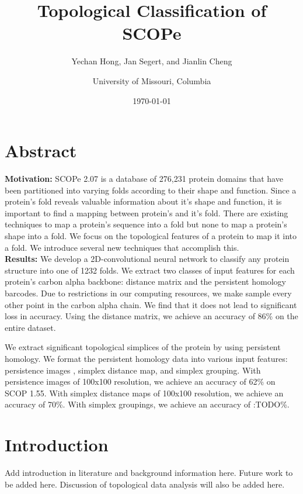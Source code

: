 \documentclass[12pt, a4paper, twocolumn, fullpage]{article}
\title{Topological Classification of SCOPe}
\author{Yechan Hong, Jan Segert, and Jianlin Cheng
\and University of Missouri, Columbia}
\date{\today}
\theoremstyle{plain}
\theoremstyle{definition}
\theoremstyle{remark}
\begin{document}
\maketitle

\section*{Abstract}

\textbf{Motivation:} SCOPe 2.07 is a database of 276,231 protein domains that have been partitioned into varying folds according to their shape and function. Since a protein's fold reveals valuable information about it's shape and function, it is important to find a mapping between protein's and it's fold. There are existing techniques to map a protein's sequence into a fold \cite{deepsf} but none to map a protein's shape into a fold. We focus on the topological features of a protein to map it into a fold. We introduce several new techniques that accomplish this.
\\
\textbf{Results:} We develop a 2D-convolutional neural network to classify any protein structure into one of 1232 folds. 
We extract two classes of input features for each protein's carbon alpha backbone: distance matrix and the persistent homology barcodes. Due to restrictions in our computing resources, we make sample every other point in the carbon alpha chain. We find that it does not lead to significant loss in accuracy.
Using the distance matrix, we achieve an accuracy of 86\% on the entire dataset.

We extract significant topological simplices of the protein by using persistent homology. We format the persistent homology data into various input features: persistence images \cite{persistenceImages}, simplex distance map, and simplex grouping.  With persistence images of 100x100 resolution, we achieve an accuracy of 62\% on SCOP 1.55. With simplex distance maps of 100x100 resolution, we achieve an accuracy of 70\%. With simplex groupings, we achieve an accuracy of :TODO\%.
	

\section{Introduction}
	Add introduction in literature and background information here. Future work to be added here. Discussion of topological data analysis will also be added here.
\end{document}
